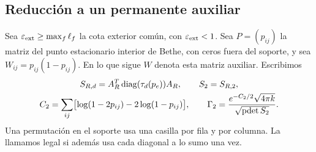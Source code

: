 \subsection{Reducción a un permanente auxiliar}\label{costes:permanente}

Sea $\varepsilon_{\rm ext}\ge\max_f\ell_f$ la cota exterior común, con $\varepsilon_{\rm ext}<1$.
Sea $P=(p_{ij})$ la matriz del punto estacionario interior de Bethe, con ceros fuera del soporte, y sea
$W_{ij}=p_{ij}(1-p_{ij})$. En lo que sigue $W$ denota esta matriz auxiliar. Escribimos
\begin{equation}\label{coste:rook-def}
 \begin{gathered}
 S_{R,d}=A_R^T\operatorname{diag}(\tau_d(p_e))A_R,\qquad S_2=S_{R,2},\\
 C_2=\sum_{ij}\bigl[\log(1-2p_{ij})-2\log(1-p_{ij})\bigr],\qquad
 \Gamma_2=\frac{e^{-C_2/2}\sqrt{4\pi k}}{\sqrt{\operatorname{pdet} S_2}} .
 \end{gathered}
\end{equation}
Una permutación en el soporte usa una casilla por fila y por columna. La llamamos legal si además usa
cada diagonal a lo sumo una vez.

